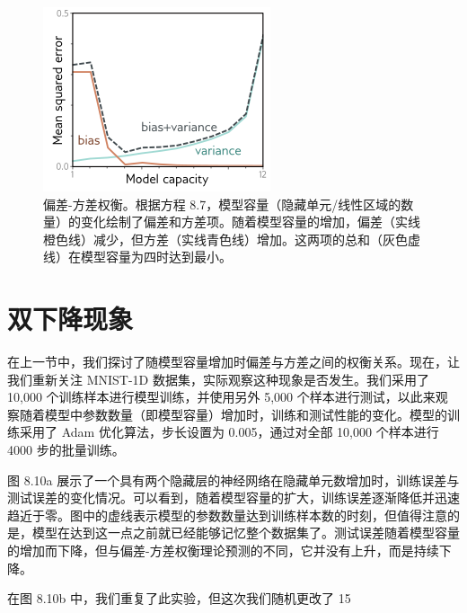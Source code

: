 \begin{figure}[ht!]
\centering
\includegraphics[width=0.7\linewidth]{png/chapter8/PerfBiasVarianceTradeoff.png}
\caption{偏差-方差权衡。根据方程 8.7，模型容量（隐藏单元/线性区域的数量）的变化绘制了偏差和方差项。随着模型容量的增加，偏差（实线橙色线）减少，但方差（实线青色线）增加。这两项的总和（灰色虚线）在模型容量为四时达到最小。}
\end{figure}

\section{双下降现象}
在上一节中，我们探讨了随模型容量增加时偏差与方差之间的权衡关系。现在，让我们重新关注 MNIST-1D 数据集，实际观察这种现象是否发生。我们采用了 10,000 个训练样本进行模型训练，并使用另外 5,000 个样本进行测试，以此来观察随着模型中参数数量（即模型容量）增加时，训练和测试性能的变化。模型的训练采用了 Adam 优化算法，步长设置为 0.005，通过对全部 10,000 个样本进行 4000 步的批量训练。

图 8.10a 展示了一个具有两个隐藏层的神经网络在隐藏单元数增加时，训练误差与测试误差的变化情况。可以看到，随着模型容量的扩大，训练误差逐渐降低并迅速趋近于零。图中的虚线表示模型的参数数量达到训练样本数的时刻，但值得注意的是，模型在达到这一点之前就已经能够记忆整个数据集了。测试误差随着模型容量的增加而下降，但与偏差-方差权衡理论预测的不同，它并没有上升，而是持续下降。

在图 8.10b 中，我们重复了此实验，但这次我们随机更改了 15%

